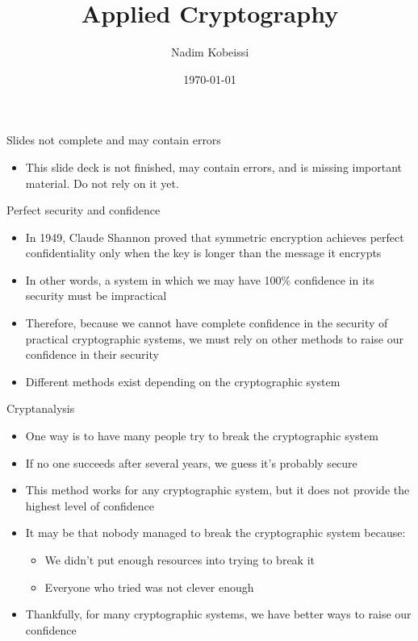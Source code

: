 \documentclass[aspectratio=169, lualatex, handout]{beamer}
\title{Applied Cryptography}
\author{Nadim Kobeissi}
\institute{American University of Beirut}
\date{\today}
\begin{document}
\begin{frame}[plain]
	\titlepage
\end{frame}

\begin{frame}{Slides not complete and may contain errors}
	\begin{itemize}
		\item This slide deck is not finished, may contain errors, and is missing important material. Do not rely on it yet.
	\end{itemize}
\end{frame}

\begin{frame}{Perfect security and confidence}
	\begin{itemize}
		\item In 1949, Claude Shannon proved that symmetric encryption achieves perfect confidentiality only when the key is longer than the message it encrypts
		\item In other words, a system in which we may have 100\% confidence in its security must be impractical
		\item Therefore, because we cannot have complete confidence in the security of practical cryptographic systems, we must rely on other methods to raise our confidence in their security
		\item Different methods exist depending on the cryptographic system
	\end{itemize}
\end{frame}

\begin{frame}{Cryptanalysis}
	\begin{itemize}
		\item One way is to have many people try to break the cryptographic system
		\item If no one succeeds after several years, we guess it's probably secure
		\item This method works for any cryptographic system, but it does not provide the highest level of confidence
		\item It may be that nobody managed to break the cryptographic system because:
		      \begin{itemize}
			      \item We didn't put enough resources into trying to break it
			      \item Everyone who tried was not clever enough
		      \end{itemize}
		\item Thankfully, for many cryptographic systems, we have better ways to raise our confidence
	\end{itemize}
\end{frame}
\end{document}
